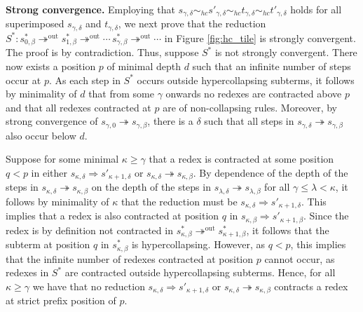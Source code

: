 \documentclass{LMCS}
\theoremstyle{plain}
\theoremstyle{definition}
\newcommand{\trewt}{\twoheadrightarrow}
\newcommand{\out}{\trewt^\mathrm{out}}
\newcommand{\simhc}{\sim_{hc}}
\newcommand{\dev}{\Rightarrow}
\begin{document}
{\bf Strong convergence.}
Employing that $s_{\gamma, \delta} \simhc s'_{\gamma, \delta} \simhc t_{\gamma, \delta} \simhc t'_{\gamma, \delta}$ holds for all superimposed $s_{\gamma, \delta}$ and $t_{\gamma, \delta}$, we next prove that the reduction $S^* : s^*_{0, \beta} \out s^*_{1, \beta} \out \cdots \, s^*_{\gamma, \beta} \out \cdots$ in Figure \ref{fig:hc_tile} is strongly convergent. The proof is by contradiction. Thus, suppose $S^*$ is not strongly convergent. There now exists a position $p$ of minimal depth $d$ such that an infinite number of steps occur at $p$. As each step in $S^*$ occurs outside hypercollapsing subterms, it follows by minimality of $d$ that from some $\gamma$ onwards no redexes are contracted above $p$ and that all redexes contracted at $p$ are of non-collapsing rules. Moreover, by strong convergence of $s_{\gamma, 0} \trewt s_{\gamma, \beta}$, there is a $\delta$ such that all steps in $s_{\gamma, \delta} \trewt s_{\gamma, \beta}$ also occur below $d$.

Suppose for some minimal $\kappa \geq \gamma$ that a redex is contracted at some position $q < p$ in either $s_{\kappa, \delta} \dev s'_{\kappa + 1, \delta}$ or $s_{\kappa, \delta} \trewt s_{\kappa, \beta}$. By dependence of the depth of the steps in $s_{\kappa, \delta} \trewt s_{\kappa, \beta}$ on the depth of the steps in $s_{\lambda, \delta} \trewt s_{\lambda, \beta}$ for all $\gamma \leq \lambda < \kappa$, it follows by minimality of $\kappa$ that the reduction must be $s_{\kappa, \delta} \dev s'_{\kappa + 1, \delta}$. This implies that a redex is also contracted at position $q$ in $s_{\kappa, \beta} \dev s'_{\kappa + 1, \beta}$. Since the redex is by definition not contracted in $s^*_{\kappa, \beta} \out s^*_{\kappa + 1, \beta}$, it follows that the subterm at position $q$ in $s^*_{\kappa, \beta}$ is hypercollapsing. However, as $q < p$, this implies that the infinite number of redexes contracted at position $p$ cannot occur, as redexes in $S^*$ are contracted outside hypercollapsing subterms. Hence, for all $\kappa \geq \gamma$ we have that no reduction $s_{\kappa, \delta} \dev s'_{\kappa + 1, \delta}$ or $s_{\kappa, \delta} \trewt s_{\kappa, \beta}$ contracts a redex at strict prefix position of $p$.
\end{document}
